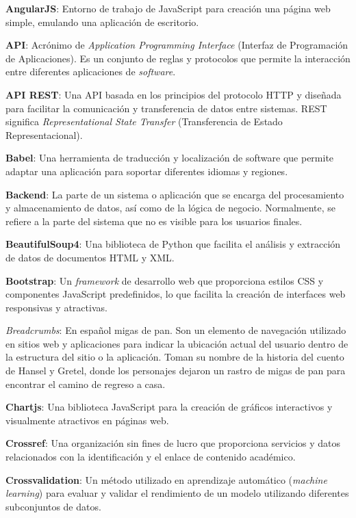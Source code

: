 
\textbf{AngularJS}: Entorno de trabajo de JavaScript para creación una página web simple, emulando una aplicación de escritorio.

\textbf{API}: Acrónimo de \textit{Application Programming Interface} (Interfaz de Programación de Aplicaciones). Es un conjunto de reglas y protocolos que permite la interacción entre diferentes aplicaciones de \textit{software}.

\textbf{API REST}: Una API basada en los principios del protocolo HTTP y diseñada para facilitar la comunicación y transferencia de datos entre sistemas. REST significa \textit{Representational State Transfer} (Transferencia de Estado Representacional).

\textbf{Babel}: Una herramienta de traducción y localización de software que permite adaptar una aplicación para soportar diferentes idiomas y regiones.

\textbf{Backend}: La parte de un sistema o aplicación que se encarga del procesamiento y almacenamiento de datos, así como de la lógica de negocio. Normalmente, se refiere a la parte del sistema que no es visible para los usuarios finales.

\textbf{BeautifulSoup4}: Una biblioteca de Python que facilita el análisis y extracción de datos de documentos HTML y XML.

\textbf{Bootstrap}: Un \textit{framework} de desarrollo web que proporciona estilos CSS y componentes JavaScript predefinidos, lo que facilita la creación de interfaces web responsivas y atractivas.

\textit{\textit{Breadcrumbs}}: En español migas de pan. Son un elemento de navegación utilizado en sitios web y aplicaciones para indicar la ubicación actual del usuario dentro de la estructura del sitio o la aplicación. Toman su nombre de la historia del cuento de Hansel y Gretel, donde los personajes dejaron un rastro de migas de pan para encontrar el camino de regreso a casa.

\textbf{Chartjs}: Una biblioteca JavaScript para la creación de gráficos interactivos y visualmente atractivos en páginas web.

\textbf{Crossref}: Una organización sin fines de lucro que proporciona servicios y datos relacionados con la identificación y el enlace de contenido académico.

\textbf{Crossvalidation}: Un método utilizado en aprendizaje automático (\textit{machine learning}) para evaluar y validar el rendimiento de un modelo utilizando diferentes subconjuntos de datos.

